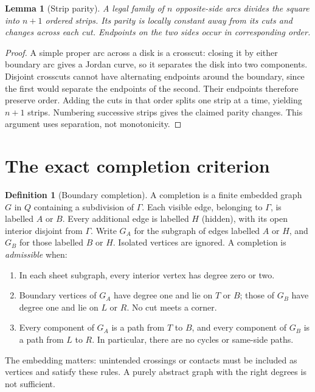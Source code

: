 \documentclass[11pt,a4paper]{article}
\newtheorem{lemma}[theorem]{Lemma}
\theoremstyle{definition}
\newtheorem{definition}[theorem]{Definition}
\begin{document}
\begin{samepage}
\begin{lemma}[Strip parity]\label{lem:parity}
A legal family of $n$ opposite-side arcs divides the square into $n+1$ ordered
strips. Its parity is locally constant away from its cuts and changes across
each cut. Endpoints on the two sides occur in corresponding order.
\end{lemma}
\begin{proof}
A simple proper arc across a disk is a crosscut: closing it by either boundary
arc gives a Jordan curve, so it separates the disk into two components.
Disjoint crosscuts cannot have alternating endpoints around the boundary,
since the first would separate the endpoints of the second. Their endpoints
therefore preserve order. Adding the cuts in that order splits one strip at
a time, yielding $n+1$ strips. Numbering successive strips gives the claimed
parity changes. This argument uses separation, not monotonicity.
\end{proof}
\end{samepage}

\section{The exact completion criterion}
\begin{definition}[Boundary completion]\label{def:completion}
A completion is a finite embedded graph $G$ in $Q$ containing a subdivision
of $\Gamma$. Each visible edge, belonging to $\Gamma$, is labelled $A$ or $B$.
Every additional edge is labelled $H$ (hidden), with its open interior
disjoint from $\Gamma$. Write $G_A$ for the subgraph of edges labelled $A$ or
$H$, and $G_B$ for those labelled $B$ or $H$. Isolated vertices are ignored.
A completion is \emph{admissible} when:
\begin{enumerate}[label=(\roman*)]
\item In each sheet subgraph, every interior vertex has degree zero or two.
\item Boundary vertices of $G_A$ have degree one and lie on $T$ or $B$;
      those of $G_B$ have degree one and lie on $L$ or $R$. No cut meets a corner.
\item Every component of $G_A$ is a path from $T$ to $B$, and every component
      of $G_B$ is a path from $L$ to $R$. In particular, there are no cycles
      or same-side paths.
\end{enumerate}
The embedding matters: unintended crossings or contacts must be included as
vertices and satisfy these rules. A purely abstract graph with the right
degrees is not sufficient.
\end{definition}
\end{document}
